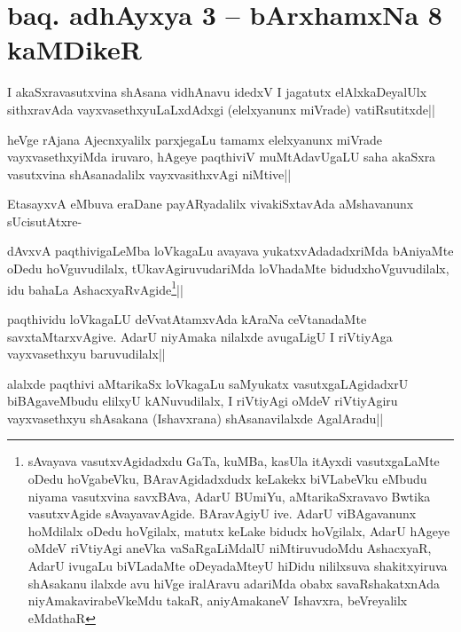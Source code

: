 \section*{baq. adhAyxya 3 -- bArxhamxNa 8 kaMDikeR}


\stext

\begin{artha}%
I akaSxravasutxvina shAsana vidhAnavu idedxV I jagatutx elAlxkaDeyalUlx sithxravAda vayxvasethxyuLaLxdAdxgi (elelxyanunx miVrade) vatiRsutitxde||
\end{artha}

\begin{artha}
heVge rAjana Ajecnxyalilx parxjegaLu tamamx elelxyanunx miVrade vayxvasethxyiMda iruvaro, hAgeye paqthiviV muMtAdavUgaLU saha akaSxra vasutxvina shAsanadalilx vayxvasithxvAgi niMtive||
\end{artha}


\begin{artha}
EtasayxvA eMbuva eraDane payARyadalilx vivakiSxtavAda aMshavanunx sUcisutAtxre-
\end{artha}

\begin{artha}%
dAvxvA paqthivigaLeMba loVkagaLu avayava yukatxvAdadadxriMda bAniyaMte oDedu hoVguvudilalx, tUkavAgiruvudariMda loVhadaMte bidudxhoVguvudilalx, idu bahaLa AshacxyaRvAgide\footnote[1]{sAvayava vasutxvAgidadxdu GaTa, kuMBa, kasUla itAyxdi vasutxgaLaMte oDedu hoVgabeVku, BAravAgidadxdudx keLakekx biVLabeVku eMbudu niyama vasutxvina savxBAva, AdarU BUmiYu, aMtarikaSxravavo Bwtika vasutxvAgide sAvayavavAgide. BAravAgiyU ive. AdarU viBAgavanunx hoMdilalx oDedu hoVgilalx, matutx keLake bidudx hoVgilalx, AdarU hAgeye oMdeV riVtiyAgi aneVka vaSaRgaLiMdalU niMtiruvudoMdu AshacxyaR, AdarU ivugaLu biVLadaMte oDeyadaMteyU hiDidu nililxsuva shakitxyiruva shAsakanu ilalxde avu hiVge iralAravu adariMda obabx savaRshakatxnAda niyAmakavirabeVkeMdu takaR, aniyAmakaneV Ishavxra, beVreyalilx eMdathaR}||
\end{artha}

\begin{artha}
paqthividu loVkagaLU deVvatAtamxvAda kAraNa ceVtanadaMte savxtaMtarxvAgive. AdarU niyAmaka nilalxde avugaLigU I riVtiyAga vayxvasethxyu baruvudilalx||
\end{artha}

\begin{artha}
alalxde paqthivi aMtarikaSx loVkagaLu saMyukatx vasutxgaLAgidadxrU biBAgaveMbudu elilxyU kANuvudilalx, I riVtiyAgi oMdeV riVtiyAgiru vayxvasethxyu shAsakana (Ishavxrana) shAsanavilalxde AgalAradu||
\end{artha}

